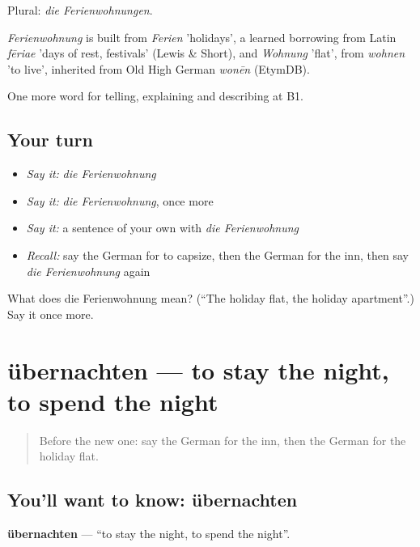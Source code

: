 Plural: \emph{die Ferienwohnungen}.

\begin{cousinweb}
\emph{Ferienwohnung} is built from \emph{Ferien} 'holidays', a learned borrowing from Latin \emph{fēriae} 'days of rest, festivals' (Lewis \& Short), and \emph{Wohnung} 'flat', from \emph{wohnen} 'to live', inherited from Old High German \emph{wonēn} (EtymDB).
\end{cousinweb}

\begin{grammarlens}[title={What you've built}]
One more word for telling, explaining and describing at B1.
\end{grammarlens}

\subsection*{Your turn}
\begin{itemize}
\raggedright
  \item \emph{Say it:} \emph{die Ferienwohnung}
  \item \emph{Say it:} \emph{die Ferienwohnung}, once more
  \item \emph{Say it:} a sentence of your own with \emph{die Ferienwohnung}
  \item \emph{Recall:} say the German for to capsize, then the German for the inn, then say \emph{die Ferienwohnung} again
\end{itemize}

\begin{tcolorbox}[breakable,colback=teal!4,colframe=teal!35!black,title={Before you move on}]
What does die Ferienwohnung mean? (\textquotedblleft{}The holiday flat, the holiday apartment\textquotedblright{}.) Say it once more.
\end{tcolorbox}
\section[übernachten]{übernachten — to stay the night, to spend the night}

\label{lesson:GE-C424-uebernachten}



\begin{quote}
Before the new one: say the German for the inn, then the German for the holiday flat.
\end{quote}

\subsection*{You'll want to know: übernachten}
\textbf{übernachten} — \textquotedblleft{}to stay the night, to spend the night\textquotedblright{}.

